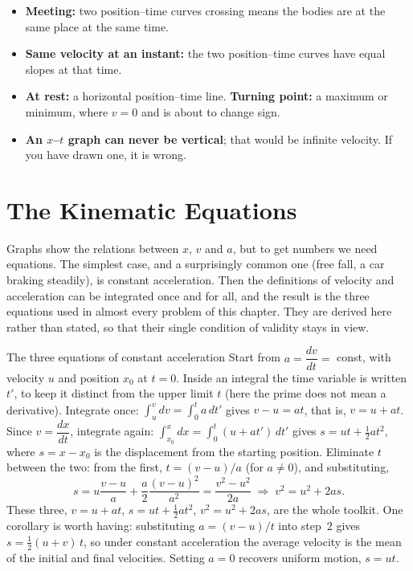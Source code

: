 \begin{itemize}
\item \textbf{Meeting:} two position--time curves crossing means the bodies are at the same place at the
same time.
\item \textbf{Same velocity at an instant:} the two position--time curves have equal slopes at that
time.
\item \textbf{At rest:} a horizontal position--time line. \textbf{Turning point:} a maximum or minimum,
where $v=0$ and is about to change sign.
\item \textbf{An $x$--$t$ graph can never be vertical}; that would be infinite velocity. If you have
drawn one, it is wrong.
\end{itemize}

\section{The Kinematic Equations}

Graphs show the relations between $x$, $v$ and $a$, but to get numbers we need equations. The simplest case,
and a surprisingly common one (free fall, a car braking steadily), is constant acceleration. Then the
definitions of velocity and acceleration can be integrated once and for
all, and the result is the three equations used in almost every problem of this chapter. They are derived
here rather than stated, so that their single condition of validity stays in view.

\begin{derivbox}{The three equations of constant acceleration}
Start from $a=\dfrac{dv}{dt}=$ const, with velocity $u$ and position $x_0$ at $t=0$. Inside an integral
the time variable is written $t'$, to keep it distinct from the upper limit $t$ (here the prime does not
mean a derivative).
 Integrate once: $\int_u^v dv=\int_0^t a\,dt'$ gives $v-u=at$, that is, $v=u+at$.
 Since $v=\dfrac{dx}{dt}$, integrate again: $\int_{x_0}^{x}dx=\int_0^t(u+at')\,dt'$ gives
$s=ut+\tfrac12 at^2$, where $s=x-x_0$ is the displacement from the starting position.
 Eliminate $t$ between the two: from the first, $t=(v-u)/a$ (for $a\neq0$), and substituting,
\[
s=u\frac{v-u}{a}+\frac{a}{2}\frac{(v-u)^2}{a^2}=\frac{v^2-u^2}{2a}
\;\Longrightarrow\;v^2=u^2+2as.
\]
These three, $v=u+at$, $s=ut+\tfrac12at^2$, $v^2=u^2+2as$, are the whole toolkit. One corollary is
worth having: substituting $a=(v-u)/t$ into step~2 gives $s=\tfrac12(u+v)\,t$, so under constant
acceleration the average velocity is the mean of the initial and final velocities. Setting $a=0$
recovers uniform motion, $s=ut$.
\end{derivbox}


